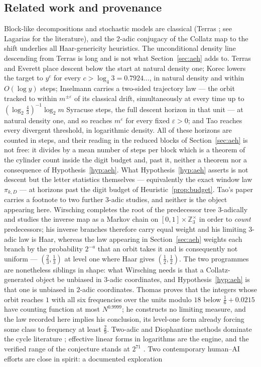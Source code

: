 \documentclass[11pt]{article}
\theoremstyle{remark}
\newcommand{\Z}{\mathbb{Z}}
\begin{document}
\subsection*{Related work and provenance}
Block-like decompositions and stochastic models are classical (Terras \cite{terras}; see Lagarias \cite{lagarias} for the literature), and the $2$-adic conjugacy of the Collatz map to the shift underlies all Haar-genericity heuristics. The unconditional density line descending from Terras is long and is not what Section~\ref{sec:aeh} adds to. Terras \cite{terras} and Everett \cite{everett} place descent below the start at natural density one; Korec \cite{korec} lowers the target to $y^{c}$ for every $c > \log_4 3 = 0.7924\ldots$, in natural density and within $O(\log y)$ steps; Inselmann \cite{inselmann} carries a two-sided trajectory law --- the orbit tracked to within $m^{\pm\varepsilon}$ of its classical drift, simultaneously at every time up to $(\log_2\tfrac43)^{-1}\log_2 m$ Syracuse steps, the full descent horizon in that unit --- at natural density one, and so reaches $m^{\varepsilon}$ for every fixed $\varepsilon>0$; and Tao \cite{tao} reaches every divergent threshold, in logarithmic density. All of these horizons are counted in steps, and their reading in the reduced blocks of Section~\ref{sec:aeh} is not free: it divides by a mean number of steps per block which is a theorem of the cylinder count inside the digit budget and, past it, neither a theorem nor a consequence of Hypothesis~\ref{hyp:aeh}. What Hypothesis~\ref{hyp:aeh} asserts is not descent but the letter statistics themselves --- equivalently the exact window law $\pi_{k,D}$ --- at horizons past the digit budget of Heuristic~\ref{prop:budget}. Tao's paper carries a footnote to two further $3$-adic studies, and neither is the object appearing here. Wirsching \cite{wirsching} completes the root of the predecessor tree $3$-adically and studies the inverse map as a Markov chain on $[0,1] \times \Z_3^{\times}$ in order to \emph{count} predecessors; his inverse branches therefore carry equal weight and his limiting $3$-adic law is Haar, whereas the law appearing in Section~\ref{sec:aeh} weights each branch by the probability $2^{-a}$ that an orbit takes it and is consequently not uniform --- $(\tfrac23,\tfrac13)$ at level one where Haar gives $(\tfrac12,\tfrac12)$. The two programmes are nonetheless siblings in shape: what Wirsching needs is that a Collatz-generated object be unbiased in $3$-adic coordinates, and Hypothesis~\ref{hyp:aeh} is that one is unbiased in $2$-adic coordinates. Thomas \cite{thomas} proves that the integers whose orbit reaches $1$ with all six frequencies over the units modulo $18$ below $\tfrac16 + 0.0215$ have counting function at most $N^{0.9999}$; he constructs no limiting measure, and the law recorded here implies his conclusion, its level-one form already forcing some class to frequency at least $\tfrac29$. Two-adic and Diophantine methods dominate the cycle literature \cite{steiner,sdw,hercher,eliahou}; effective linear forms in logarithms \cite{yu,bl,rhin} are the engine, and the verified range of the conjecture stands at $2^{71}$ \cite{barina}. Two contemporary human--AI efforts are close in spirit: a documented exploration 
\end{document}
